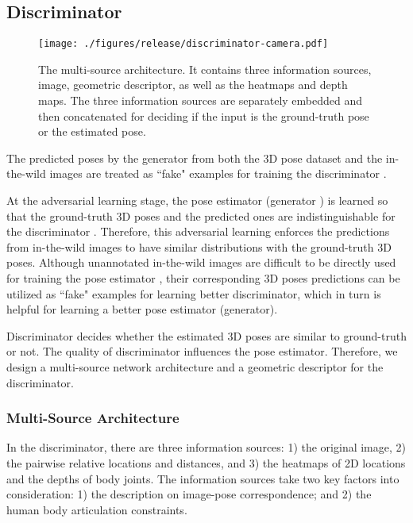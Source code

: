 \documentclass[10pt,twocolumn,letterpaper]{article}
\begin{document}
\subsection{Discriminator}

\begin{figure}[t]
	\begin{center}
		\texttt{[image: ./figures/release/discriminator-camera.pdf]}
	\end{center}
	\vspace{-1em}
	\caption{The multi-source architecture. It contains three information sources, image, geometric descriptor, as well as the heatmaps and depth maps. The three information sources are separately embedded and then concatenated for deciding if the input is the ground-truth pose or the estimated pose.  }
	\vspace{-1em}
	\label{fig:pose-d}
\end{figure}



The predicted poses by the generator  from both the 3D pose dataset and the in-the-wild images are treated as ``fake" examples for training the discriminator . 


At the adversarial learning stage, the pose estimator (generator ) is learned so that the ground-truth 3D poses and the predicted ones are indistinguishable for the discriminator . 
Therefore, this adversarial learning enforces the predictions from in-the-wild images to have similar distributions with the ground-truth 3D poses. 
Although unannotated in-the-wild images are difficult to be directly used for training the pose estimator , their corresponding 3D poses predictions can be utilized as ``fake" examples for learning better discriminator, which in turn is helpful for learning a better pose estimator (generator).


Discriminator decides whether the estimated 3D poses are similar to ground-truth or not. 
The quality of discriminator influences the pose estimator. 
Therefore, we design a multi-source network architecture and a geometric descriptor for the discriminator. 

\vspace{-1em}
\subsubsection{Multi-Source Architecture} 



In the discriminator, there are three information sources: 1) the original image, 2) the pairwise relative locations and distances, and 3) the heatmaps of 2D locations and the depths of body joints.
The information sources take two key factors into consideration: 1) the description  on image-pose  correspondence; and 2) the human body articulation constraints. 
\end{document}
